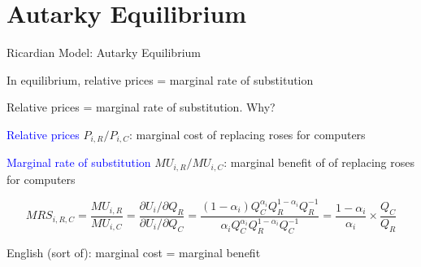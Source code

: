 \documentclass[notes,11pt, aspectratio=169, xcolor=table]{beamer}
\newenvironment{wideitemize}{\itemize\addtolength{\itemsep}{10pt}}{\enditemize}
\begin{document}
\section{Autarky Equilibrium}

\begin{frame}{Ricardian Model: Autarky Equilibrium}


\begin{wideitemize}
    \item In equilibrium, relative prices = marginal rate of substitution

    \item Relative prices = marginal rate of substitution. Why?

    \item \textcolor{blue}{Relative prices} $P_{i,R}/P_{i,C}$: marginal cost of replacing roses for computers

    \item \textcolor{blue}{Marginal rate of substitution} $MU_{i,R}/MU_{i,C}$: marginal benefit of of replacing roses for computers

    \begin{equation*}
        MRS_{i,R,C} = \frac{MU_{i,R}}{MU_{i,C}} = \frac{ \partial U_i / \partial Q_R }{\partial U_i / \partial Q_C  } = \frac{ (1-\alpha_i ) Q_C^{\alpha_i} Q_R^{1-\alpha_i} Q_{R}^{-1} }{ \alpha_i  Q_C^{\alpha_i} Q_R^{1-\alpha_i} Q_{C}^{-1} } = \frac{1-\alpha_i}{\alpha_i} \times \frac{Q_C}{Q_R}
    \end{equation*}


    \item English (sort of): marginal cost = marginal benefit 
    \end{wideitemize}

\end{frame}
\end{document}
